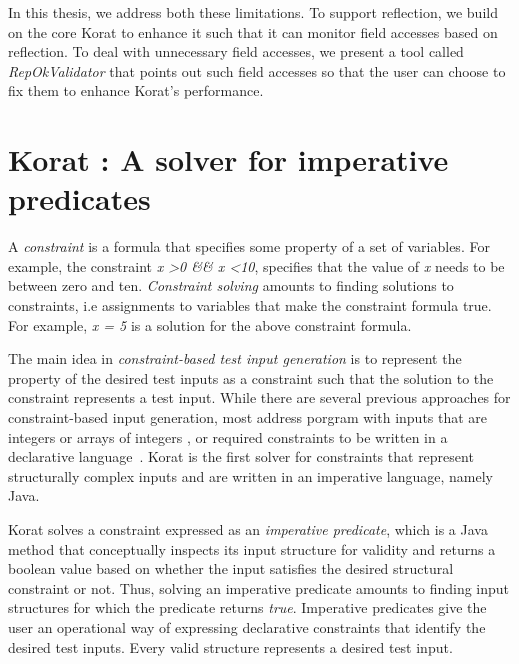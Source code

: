 \para
In this thesis, we address both these limitations.  To support reflection, we build on the core Korat to enhance it such that it can monitor field accesses based on reflection.  To deal with unnecessary field accesses, we present a tool called \emph{RepOkValidator} that points out such field accesses so that the user can choose to fix them to enhance Korat’s performance.

\section{Korat : A solver for imperative predicates}
\label{sec:korat-solver-for-predicates}
A \emph{constraint} is a formula that specifies some property of a set
of variables. For example, the constraint \emph{x \textgreater 0 \&\&
  x \textless 10}, specifies that the value of \emph{x} needs to be
between zero and ten. \emph{Constraint solving} amounts to finding
solutions to constraints, i.e assignments to variables that make the
constraint formula true. For example, \emph{x = 5} is a solution for
the above constraint formula.

\para
The main idea in \emph{constraint-based test input generation} is to
represent the property of the desired test inputs as a constraint such
that the solution to the constraint represents a test input. While
there are several previous approaches for constraint-based input
generation, most address porgram with inputs that are integers or
arrays of integers
\cite{demilli1991constraint,huang1975approach,king1976symbolic,korel1996automated},
or required constraints to be written in a declarative
language~\cite{marinov2001testera}. Korat \cite{boyapati2002korat} is the first
solver for constraints that represent structurally complex inputs and
are written in an imperative language, namely Java.

\para Korat solves a constraint expressed as an \emph{imperative
  predicate}, which is a Java method that conceptually inspects its
input structure for validity and returns a boolean value based on
whether the input satisfies the desired structural constraint or not.
Thus, solving an imperative predicate amounts to finding input
structures for which the predicate returns \emph{true}.  Imperative
predicates give the user an operational way of expressing declarative
constraints that identify the desired test inputs.  Every valid
structure represents a desired test input.

